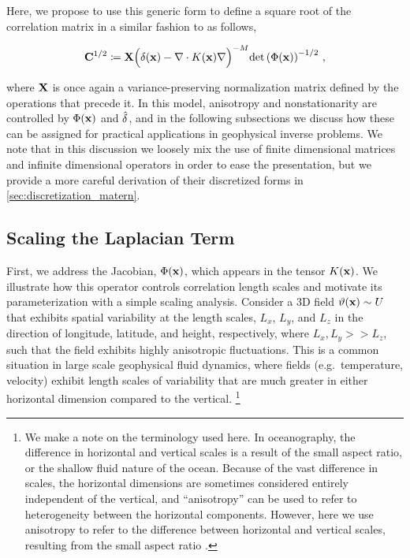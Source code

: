 Here, we propose to use this generic form to define a square root of the
correlation matrix in a similar fashion to
\citet{weaver_correlation_2001, mirouze_representation_2010,
carrier_background-error_2010}
as follows,
\begin{linenomath*}\begin{equation}
    \mathbf{C}^{1/2} \coloneqq \mathbf{X}
    \Big(\delta(\mathbf{x})- \nabla\cdot K(\mathbf{x})\nabla\Big)^{-M}
    \text{det}\left(\Phi(\mathbf{x})\right)^{-1/2} \, ,
    \label{eq:matern_operator}
\end{equation}\end{linenomath*}
where $\mathbf{X}$ is
once again a variance-preserving normalization matrix defined by the operations
that precede it.
In this model,
anisotropy and nonstationarity are controlled by
$\Phi(\mathbf{x})$ and $\hat{\delta}$, and in the following subsections we discuss how these can be assigned for
practical applications in geophysical inverse problems.
We note that in this discussion we loosely mix the use of
finite dimensional matrices and infinite dimensional operators
in order to ease the presentation, but we provide a more careful
derivation of their discretized forms in \cref{sec:discretization_matern}.

\subsection{Scaling the Laplacian Term}
\label{ssec:scaling_laplacian}

First, we address the Jacobian, $\Phi(\mathbf{x})$, which appears in the tensor
$K(\mathbf{x})$.
We illustrate how this operator controls correlation length scales and
motivate its parameterization with a simple scaling analysis.
Consider a 3D field $\vartheta(\mathbf{x})\sim U$ that exhibits spatial variability at the
length scales, $L_x$, $L_y$, and $L_z$ in the direction of longitude, latitude,
and height, respectively,
where $L_x, L_y >> L_z$, such that the field exhibits highly
anisotropic fluctuations.
This is a common situation in large scale geophysical fluid
dynamics, where fields (e.g.\ temperature, velocity) exhibit length scales of
variability that are much greater in either horizontal dimension compared to the
vertical.
\footnote{
    We make a note on the terminology used here.
    In oceanography, the difference in horizontal and vertical scales
    is a result of the small aspect ratio, or the shallow fluid nature of the ocean.
    Because of the vast difference in scales, the horizontal dimensions are
    sometimes considered entirely independent of the vertical, and ``anisotropy''
    can be used to refer to heterogeneity between the horizontal components.
    However, here we use anisotropy to refer to the difference between horizontal
    and vertical scales, resulting from the small aspect ratio \citep{vallis2006}.
}

